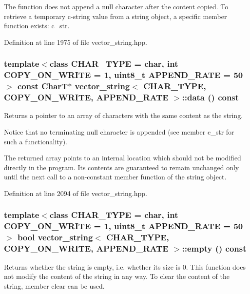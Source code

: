 The function does not append a null character after the content copied. To retrieve a temporary c-string value from a string object, a specific member function exists: c\_\-str. 

Definition at line 1975 of file vector\_\-string.hpp.\hypertarget{classvector__string_96e3871846c162930623048ce8e053f1}{
\subsubsection[{data}]{\setlength{\rightskip}{0pt plus 5cm}template$<$class CHAR\_\-TYPE  = char, int COPY\_\-ON\_\-WRITE = 1, uint8\_\-t APPEND\_\-RATE = 50$>$ const CharT$\ast$ {\bf vector\_\-string}$<$ CHAR\_\-TYPE, COPY\_\-ON\_\-WRITE, APPEND\_\-RATE $>$::data () const}}
\label{classvector__string_96e3871846c162930623048ce8e053f1}


Returns a pointer to an array of characters with the same content as the string.

Notice that no terminating null character is appended (see member c\_\-str for such a functionality).

The returned array points to an internal location which should not be modified directly in the program. Its contents are guaranteed to remain unchanged only until the next call to a non-constant member function of the string object. 

Definition at line 2094 of file vector\_\-string.hpp.\hypertarget{classvector__string_1b6ed56a2ebb354a819c4830ebb6c23b}{
\subsubsection[{empty}]{\setlength{\rightskip}{0pt plus 5cm}template$<$class CHAR\_\-TYPE  = char, int COPY\_\-ON\_\-WRITE = 1, uint8\_\-t APPEND\_\-RATE = 50$>$ bool {\bf vector\_\-string}$<$ CHAR\_\-TYPE, COPY\_\-ON\_\-WRITE, APPEND\_\-RATE $>$::empty () const}}
\label{classvector__string_1b6ed56a2ebb354a819c4830ebb6c23b}


Returns whether the string is empty, i.e. whether its size is 0. This function does not modify the content of the string in any way. To clear the content of the string, member clear can be used. 

